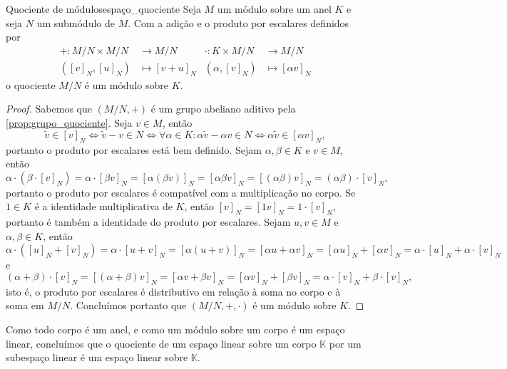 \begin{proposition}{Quociente de módulos}{espaço_quociente}
    Seja \(M\) um módulo sobre um anel \(K\) e seja \(N\) um submódulo de \(M\). Com a adição e o produto por escalares definidos por
    \begin{align*}
        + : M/N \times M/N &\to M/N&
        \cdot : K \times M/N &\to M/N\\
        ([v]_N,[u]_N) &\mapsto [v + u]_N&
        (\alpha,[v]_N)&\mapsto [\alpha v]_N
    \end{align*}
    o quociente \(M/N\) é um módulo sobre \(K\).
\end{proposition}
\begin{proof}
     Sabemos que \((M/N, +)\) é um grupo abeliano aditivo pela \cref{prop:grupo_quociente}. Seja \(v \in M\), então
    \begin{equation*}
        \tilde{v} \in [v]_N \iff \tilde{v} - v \in N \iff \forall \alpha \in K: \alpha\tilde{v} - \alpha v \in N \iff \alpha \tilde{v} \in [\alpha v]_N,
    \end{equation*}
    portanto o produto por escalares está bem definido. Sejam \(\alpha, \beta \in K\) e \(v \in M\), então
    \begin{equation*}
        \alpha \cdot \left(\beta \cdot [v]_N\right) = \alpha \cdot [\beta v]_N = [\alpha (\beta v)]_N = [\alpha \beta v]_N = [(\alpha \beta) v]_N = (\alpha \beta)\cdot [v]_N,
    \end{equation*}
    portanto o produto por escalares é compatível com a multiplicação no corpo. Se \(1 \in K\) é a identidade multiplicativa de \(K\), então \([v]_N = [1v]_N = 1 \cdot [v]_N\), portanto é também a identidade do produto por escalares. Sejam \(u,v \in M\) e \(\alpha, \beta \in K\), então
    \begin{equation*}
        \alpha \cdot \left([u]_N + [v]_N\right) = \alpha \cdot [u + v]_N = [\alpha (u + v)]_N = [\alpha u + \alpha v]_N = [\alpha u]_N + [\alpha v]_N = \alpha\cdot [u]_N + \alpha \cdot [v]_N
    \end{equation*}
    e
    \begin{equation*}
        (\alpha + \beta)\cdot [v]_N = [(\alpha + \beta)v]_N = [\alpha v + \beta v]_N = [\alpha v]_N + [\beta v]_N = \alpha\cdot[v]_N + \beta\cdot[v]_N,
    \end{equation*}
    isto é, o produto por escalares é distributivo em relação à soma no corpo e à soma em \(M/N\). Concluímos portanto que \((M/N, +, \cdot)\) é um módulo sobre \(K\).
\end{proof}
\begin{remark}
    Como todo corpo é um anel, e como um módulo sobre um corpo é um espaço linear, concluímos que o quociente de um espaço linear sobre um corpo \(\mathbb{K}\) por um subespaço linear é um espaço linear sobre \(\mathbb{K}\).
\end{remark}
